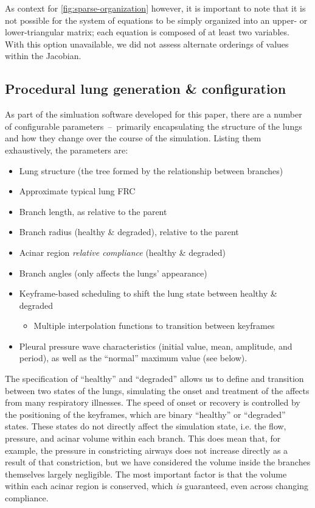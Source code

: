 As context for \autoref{fig:sparse-organization} however, it is important to note that it is not
possible for the system of equations to be simply organized into an upper- or lower-triangular
matrix; each equation is composed of at least two variables. With this option unavailable, we did
not assess alternate orderings of values within the Jacobian.

\subsection{Procedural lung generation \& configuration} \label{sec:procedural-generation}

As part of the simluation software developed for this paper, there are a number of configurable
parameters~--~primarily encapsulating the structure of the lungs and how they change over the course
of the simulation. Listing them exhaustively, the parameters are:

\begin{itemize}
\item Lung structure (the tree formed by the relationship between branches)
\item Approximate typical lung FRC
\item Branch length, as relative to the parent
\item Branch radius (healthy \& degraded), relative to the parent
\item Acinar region \textit{relative compliance} (healthy \& degraded)
\item Branch angles (only affects the lungs' appearance)
\item Keyframe-based scheduling to shift the lung state between healthy \& degraded
    \begin{itemize}
    \item Multiple interpolation functions to transition between keyframes
    \end{itemize}
\item Pleural pressure wave characteristics (initial value, mean, amplitude, and period), as well as
    the ``normal'' maximum value (see below).
\end{itemize}

The specification of ``healthy'' and ``degraded'' allows us to define and transition between two
states of the lungs, simulating the onset and treatment of the affects from many respiratory
illnesses. The speed of onset or recovery is controlled by the positioning of the keyframes, which
are binary ``healthy'' or ``degraded'' states. These states do not directly affect the simulation
state, i.e. the flow, pressure, and acinar volume within each branch. This does mean that, for
example, the pressure in constricting airways does not increase directly as a result of that
constriction, but we have considered the volume inside the branches themselves largely negligible.
The most important factor is that the volume within each acinar region is conserved, which
\textit{is} guaranteed, even across changing compliance.

